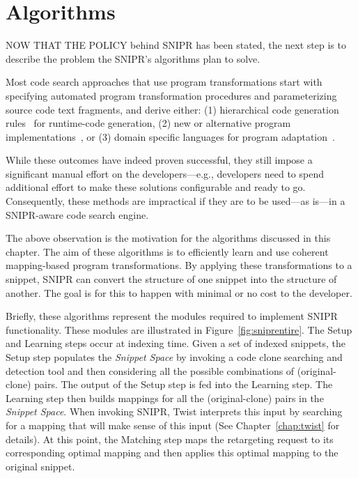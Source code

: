 \chapter{Algorithms}{}
\label{chap:algorithms}

\lettrine[lraise=0.1, nindent=0em, slope=-.5em]{N}{OW THAT THE POLICY} behind \uppercase{SNIPR} has been stated, the next step is to describe the problem the SNIPR's algorithms plan to solve.
% 

Most code search approaches that use program transformations start with specifying automated program transformation procedures and parameterizing source code text fragments, and derive either: (1) hierarchical code generation rules~\cite{Nita:2010en} for runtime-code generation, (2) new or alternative program implementations~\cite{Wightman:2012gc}, or (3) domain specific languages for program adaptation~\cite{Visser:2001tc}.

While these outcomes have indeed proven successful, they still impose a significant manual effort on the developers---e.g., developers need to spend additional effort to make these solutions configurable and ready to go. Consequently, these methods are impractical if they are to be used---as is---in a \uppercase{SNIPR}-aware code search engine. 

The above observation is the motivation for the algorithms discussed in this chapter. The aim of these algorithms is to efficiently learn and use coherent mapping-based program transformations. By applying these transformations to a snippet, \uppercase{SnipR} can convert the structure of one snippet into the structure of another. The goal is for this to happen with minimal or no cost to the developer.

Briefly, these algorithms represent the modules required to implement \uppercase{SnipR} functionality. These modules are illustrated in Figure~\ref{fig:sniprentire}. The Setup and Learning steps occur at indexing time. Given a set of indexed snippets, the Setup step populates the \emph{Snippet Space} by invoking a code clone searching and detection tool and then considering all the possible combinations of (original-clone) pairs. The output of the Setup step is fed into the Learning step. The Learning step then builds mappings for all the (original-clone) pairs in the \emph{Snippet Space}. When invoking \uppercase{SnipR}, Twist interprets this input by searching for a mapping that will make sense of this input (See Chapter~\ref{chap:twist} for details). At this point, the Matching step maps the retargeting request to its corresponding optimal mapping and then applies this optimal mapping to the original snippet.

